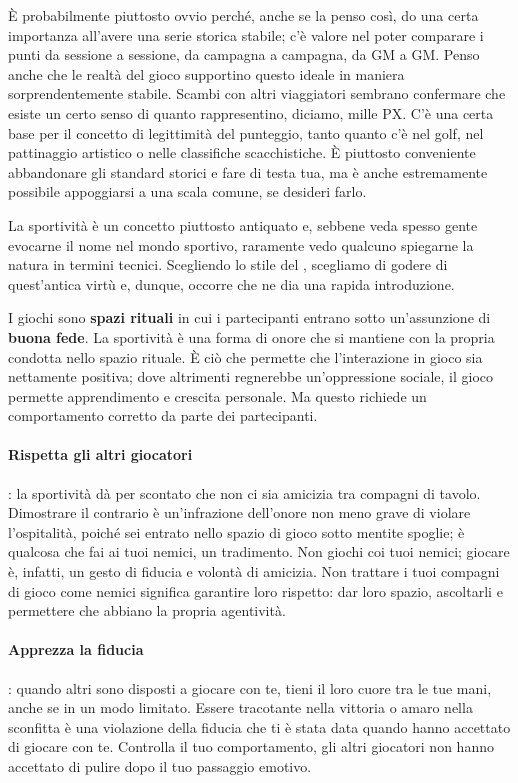 È probabilmente piuttosto ovvio perché, anche se la penso così, do una certa importanza all'avere una serie storica stabile; c'è valore nel poter comparare i punti da sessione a sessione, da campagna a campagna, da GM a GM. Penso anche che le realtà del gioco supportino questo ideale in maniera sorprendentemente stabile. Scambi con altri viaggiatori sembrano confermare che esiste un certo senso di quanto rappresentino, diciamo, mille PX. C'è una certa base per il concetto di legittimità del punteggio, tanto quanto c'è nel golf, nel pattinaggio artistico o nelle classifiche scacchistiche. È piuttosto conveniente abbandonare gli standard storici e fare di testa tua, ma è anche estremamente possibile appoggiarsi a una scala comune, se desideri farlo.


La sportività è un concetto piuttosto antiquato e, sebbene veda spesso gente evocarne il nome nel mondo sportivo, raramente vedo qualcuno spiegarne la natura in termini tecnici. Scegliendo lo stile del , scegliamo di godere di quest'antica virtù e, dunque, occorre che ne dia una rapida introduzione.

I giochi sono \textbf{spazi rituali} in cui i partecipanti entrano sotto un'assunzione di \textbf{buona fede}. La sportività è una forma di onore che si mantiene con la propria condotta nello spazio rituale. È ciò che permette che l'interazione in gioco sia nettamente positiva; dove altrimenti regnerebbe un'oppressione sociale, il gioco permette apprendimento e crescita personale. Ma questo richiede un comportamento corretto da parte dei partecipanti.

\paragraph{Rispetta gli altri giocatori}: la sportività dà per scontato che non ci sia amicizia tra compagni di tavolo. Dimostrare il contrario è un'infrazione dell'onore non meno grave di violare l'ospitalità, poiché sei entrato nello spazio di gioco sotto mentite spoglie; è qualcosa che fai ai tuoi nemici, un tradimento. Non giochi coi tuoi nemici; giocare è, infatti, un gesto di fiducia e volontà di amicizia. Non trattare i tuoi compagni di gioco come nemici significa garantire loro rispetto: dar loro spazio, ascoltarli e permettere che abbiano la propria agentività.

\paragraph{Apprezza la fiducia}: quando altri sono disposti a giocare con te, tieni il loro cuore tra le tue mani, anche se in un modo limitato. Essere tracotante nella vittoria o amaro nella sconfitta è una violazione della fiducia che ti è stata data quando hanno accettato di giocare con te. Controlla il tuo comportamento, gli altri giocatori non hanno accettato di pulire dopo il tuo passaggio emotivo.

